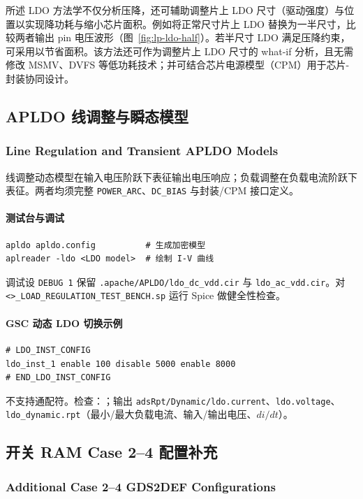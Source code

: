 所述 LDO 方法学不仅分析压降，还可辅助调整片上 LDO 尺寸（驱动强度）与位置以实现降功耗与缩小芯片面积。例如将正常尺寸片上 LDO 替换为一半尺寸，比较两者输出 pin 电压波形（图~\ref{fig:lp-ldo-half}）。若半尺寸 LDO 满足压降约束，可采用以节省面积。该方法还可作为调整片上 LDO 尺寸的 what-if 分析，且无需修改 MSMV、DVFS 等低功耗技术；并可结合芯片电源模型（CPM）用于芯片-封装协同设计。

\subsection{APLDO 线调整与瞬态模型}
\subsubsection*{Line Regulation and Transient APLDO Models}

线调整动态模型在输入电压阶跃下表征输出电压响应；负载调整在负载电流阶跃下表征。两者均须完整 \texttt{POWER\_ARC}、\texttt{DC\_BIAS} 与封装/CPM 接口定义。

\paragraph{测试台与调试}
\begin{lstlisting}
apldo apldo.config          # 生成加密模型
aplreader -ldo <LDO model>  # 绘制 I-V 曲线
\end{lstlisting}
调试设 \texttt{DEBUG 1} 保留 \texttt{.apache/APLDO/ldo\_dc\_vdd.cir} 与 \texttt{ldo\_ac\_vdd.cir}。对 \texttt{<>_LOAD_REGULATION_TEST_BENCH.sp} 运行 Spice 做健全性检查。

\paragraph{GSC 动态 LDO 切换示例}
\begin{lstlisting}
# LDO_INST_CONFIG
ldo_inst_1 enable 100 disable 5000 enable 8000
# END_LDO_INST_CONFIG
\end{lstlisting}
不支持通配符。检查：；输出 \texttt{adsRpt/Dynamic/ldo.current}、\texttt{ldo.voltage}、\texttt{ldo\_dynamic.rpt}（最小/最大负载电流、输入/输出电压、$di/dt$）。

\subsection{开关 RAM Case 2--4 配置补充}
\subsubsection*{Additional Case 2--4 GDS2DEF Configurations}

